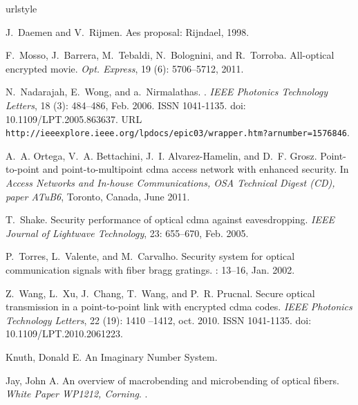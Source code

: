 \documentclass[aspectratio=169]{beamer}
\begin{document}
\begin{thebibliography}{7}


\providecommand{\natexlab}[1]{#1}
\providecommand{\url}[1]{\texttt{#1}}
\expandafter\ifx\csname urlstyle\endcsname\relax
  \providecommand{\doi}[1]{doi: #1}\else
  \providecommand{\doi}{doi: \begingroup \urlstyle{rm}\Url}\fi

 J.~Daemen and V.~Rijmen.
\newblock Aes proposal: Rijndael, 1998.

F.~Mosso, J.~Barrera, M.~Tebaldi, N.~Bolognini, and R.~Torroba.
\newblock All-optical encrypted movie.
\newblock \emph{Opt. Express}, 19 (6): 5706--5712, 2011.

N.~Nadarajah, E.~Wong, and a.~Nirmalathas.
.
\newblock \emph{IEEE Photonics Technology Letters}, 18 (3):
  484--486, Feb. 2006.
\newblock ISSN 1041-1135.
\newblock \doi{10.1109/LPT.2005.863637}.
\newblock URL
  \url{http://ieeexplore.ieee.org/lpdocs/epic03/wrapper.htm?arnumber=1576846}.

A.~A. Ortega, V.~A. Bettachini, J.~I. Alvarez-Hamelin, and D.~F. Grosz.
\newblock Point-to-point and point-to-multipoint cdma access network with
  enhanced security.
\newblock In \emph{Access Networks and In-house Communications, OSA Technical
  Digest (CD), paper ATuB6}, Toronto, Canada, June 2011.

T.~Shake.
\newblock Security performance of optical cdma against eavesdropping.
\newblock \emph{IEEE Journal of Lightwave Technology}, 23: 655--670,
  Feb. 2005.

P.~Torres, L.~Valente, and M.~Carvalho.
\newblock Security system for optical communication signals with fiber bragg
  gratings.
: 13--16, Jan. 2002.

Z.~Wang, L.~Xu, J.~Chang, T.~Wang, and P.~R. Prucnal.
\newblock Secure optical transmission in a point-to-point link with encrypted
  cdma codes.
\newblock \emph{IEEE Photonics Technology Letters}, 22 (19):
  1410 --1412, oct. 2010.
\newblock ISSN 1041-1135.
\newblock \doi{10.1109/LPT.2010.2061223}.

Knuth, Donald E.
\newblock An Imaginary Number System.


Jay, John A.
\newblock An overview of macrobending and microbending of optical fibers.
\newblock \emph{White Paper WP1212, Corning}.
.



\end{thebibliography}
\end{document}
